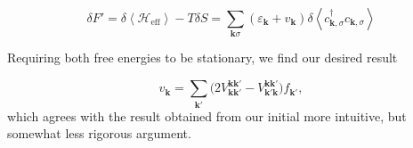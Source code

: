 \begin{equation}
\delta F' =  \delta \left\langle \mathcal{H}_{\text{eff}} \right\rangle - T \delta S = \sum_{\bm k \sigma} (\varepsilon_{\bm k} + v_{\bm k}) \delta \left\langle c_{\bm k, \sigma}^\dagger c_{\bm k, \sigma} \right\rangle
\end{equation}

Requiring both free energies to be stationary, we find our desired result

\begin{equation}
v_{\bm k} = \sum_{\bm k'} \bigg( 2 V_{\bm k \bm k'}^{\bm k \bm k'} -  V_{\bm k' \bm k}^{\bm k \bm k'}  \bigg) f_{\bm k'} ,
\end{equation}
which agrees with the result obtained from our initial more intuitive, but somewhat less rigorous  argument.